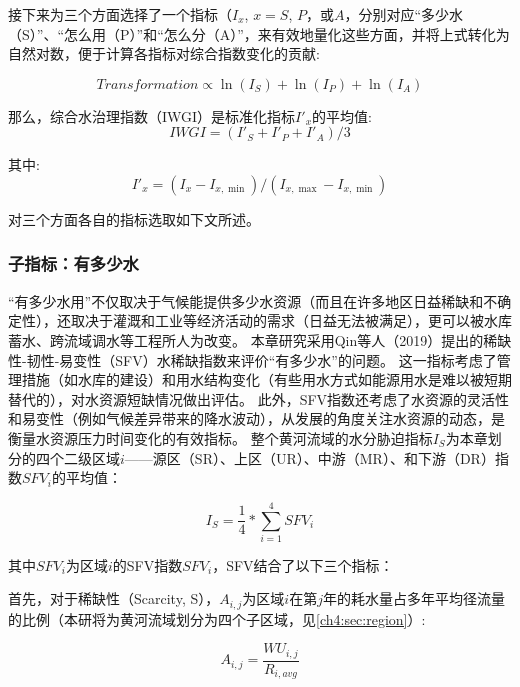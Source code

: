 接下来为三个方面选择了一个指标（$I_x$, $x=S$, $P$，或$A$，分别对应“多少水（S）”、“怎么用（P）”和“怎么分（A）”，来有效地量化这些方面，并将上式转化为自然对数，便于计算各指标对综合指数变化的贡献:

\begin{equation}
    Transformation \propto \ln(I_S) + \ln(I_P) + \ln(I_A)
\end{equation}

那么，综合水治理指数（IWGI）是标准化指标$I'_x$的平均值:
\begin{equation}
    IWGI = (I'_S + I'_P + I'_A) / 3
\end{equation}

其中:
\begin{equation}
    I'_x = (I_x - I_{x, \min}) / (I_{x, \max} - I_{x, \min})
\end{equation}

对三个方面各自的指标选取如下文所述。

\subsubsection{子指标：有多少水}

“有多少水用”不仅取决于气候能提供多少水资源（而且在许多地区日益稀缺和不确定性），还取决于灌溉和工业等经济活动的需求（日益无法被满足），更可以被水库蓄水、跨流域调水等工程所人为改变\cite{qin2019,wada2014,huang2021}。
本章研究采用Qin等人（2019）提出的稀缺性-韧性-易变性（SFV）水稀缺指数来评价“有多少水”的问题\cite{qin2019}。
这一指标考虑了管理措施（如水库的建设）和用水结构变化（有些用水方式如能源用水是难以被短期替代的），对水资源短缺情况做出评估。
此外，SFV指数还考虑了水资源的灵活性和易变性（例如气候差异带来的降水波动），从发展的角度关注水资源的动态，是衡量水资源压力\cite{qin2019}时间变化的有效指标。
整个黄河流域的水分胁迫指标$I_S$为本章划分的四个二级区域$i$——源区（SR）、上区（UR）、中游（MR）、和下游（DR）指数$SFV_{i}$的平均值：

\begin{equation}
    I_S = \frac{1}{4} * \sum_{i=1}^4 SFV_{i}
\end{equation}

其中$SFV_i$为区域$i$的SFV指数$SFV_i$，SFV结合了以下三个指标：

首先，对于稀缺性（Scarcity, S），$A_{i, j}$为区域$i$在第$j$年的耗水量占多年平均径流量的比例（本研将为黄河流域划分为四个子区域，见\ref{ch4:sec:region}）:

\begin{equation}
    A_{i, j} = \frac{WU_{i,j}}{R_{i, avg}}
\end{equation}

